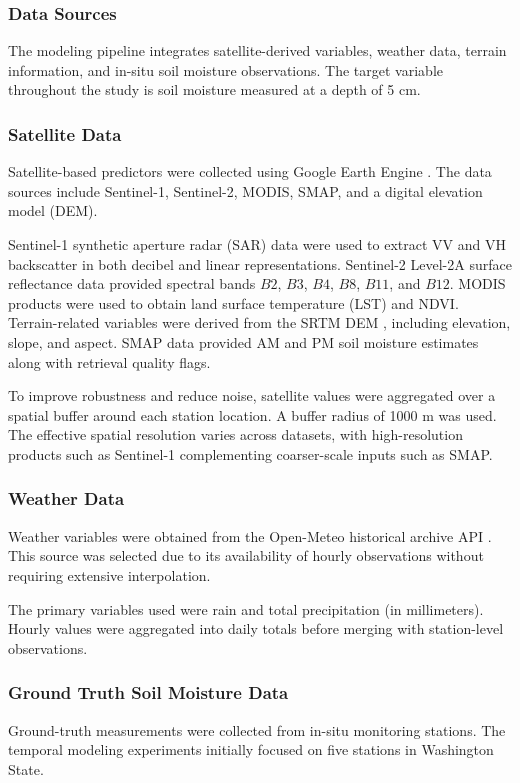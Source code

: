 \subsubsection*{Data Sources}

The modeling pipeline integrates satellite-derived variables, weather data, terrain information, and in-situ soil moisture observations. The target variable throughout the study is soil moisture measured at a depth of 5 cm.

\subsubsection*{Satellite Data}
Satellite-based predictors were collected using Google Earth Engine \cite{gee}. The data sources include Sentinel-1, Sentinel-2, MODIS, SMAP, and a digital elevation model (DEM).

Sentinel-1 synthetic aperture radar (SAR) data \cite{sentinel1} were used to extract VV and VH backscatter in both decibel and linear representations. Sentinel-2 Level-2A surface reflectance data \cite{sentinel2} provided spectral bands \(B2\), \(B3\), \(B4\), \(B8\), \(B11\), and \(B12\). MODIS products \cite{modis} were used to obtain land surface temperature (LST) and NDVI. Terrain-related variables were derived from the SRTM DEM \cite{srtm}, including elevation, slope, and aspect. SMAP data \cite{smap} provided AM and PM soil moisture estimates along with retrieval quality flags.

To improve robustness and reduce noise, satellite values were aggregated over a spatial buffer around each station location. A buffer radius of 1000 m was used. The effective spatial resolution varies across datasets, with high-resolution products such as Sentinel-1 complementing coarser-scale inputs such as SMAP.

\subsubsection*{Weather Data}
Weather variables were obtained from the Open-Meteo historical archive API \cite{openmeteo}. This source was selected due to its availability of hourly observations without requiring extensive interpolation.

The primary variables used were rain and total precipitation (in millimeters). Hourly values were aggregated into daily totals before merging with station-level observations.

\subsubsection*{Ground Truth Soil Moisture Data}
Ground-truth measurements were collected from in-situ monitoring stations. The temporal modeling experiments initially focused on five stations in Washington State.

